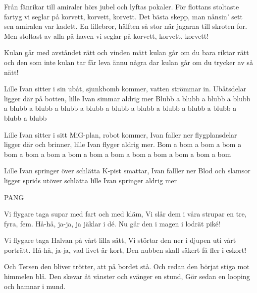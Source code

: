 \songtext{}Från fänrikar till amiraler
hörs jubel och lyftas pokaler.
För flottans stoltaste fartyg
vi seglar på korvett, korvett, korvett.
Det bästa skepp, man nånsin' sett
sen amiralen var kadett.
En lillebror, hälften så stor
när jagarna till skroten for.
Men stoltast av alla på haven
vi seglar på korvett, korvett, korvett!





\songtext{}Kulan går
med avståndet rätt och vinden mätt
kulan går
om du bara riktar rätt
och den som inte kulan tar
får leva ännu några dar
kulan går
om du trycker av så nätt!





\songtext{}Lille Ivan sitter i sin ubåt,
sjunkbomb kommer, vatten strömmar in.
Ubåtsdelar ligger där på botten,
lille Ivan simmar aldrig mer
Blubb a blubb a blubb a blubb a blubb a blubb a 
blubb a blubb a blubb a blubb a blubb a blubb a
blubb a blubb a blubb

Lille Ivan sitter i sitt MiG-plan,
robot kommer, Ivan faller ner
flygplansdelar ligger där och brinner,
lille Ivan flyger aldrig mer.
Bom a bom a bom a bom a bom a bom a bom a
bom a bom a bom a bom a bom a bom a bom a
bom

Lille Ivan springer över schlätta
K-pist smattar, Ivan falller ner
Blod och slamsor ligger sprids utöver schlätta
lille Ivan springer aldrig mer

PANG




\songtext{}Vi flygare taga supar med fart och med kläm,
Vi slår dem i våra strupar en tre, fyra, fem.
Hå-hå, ja-ja, ja jäklar i dé.
Nu går den i magen i lodrät piké!

Vi flygare taga Halvan på vårt lilla sätt,
Vi störtar den ner i djupen uti vårt porträtt.
Hå-hå, ja-ja, vad livet är kort,
Den nubben skall säkert få fler i eskort!

Och Tersen den bliver trötter, att på bordet stå.
Och redan den börjat stiga mot himmelen blå.
Den skevar åt vänster och svänger en stund,
Gör sedan en looping och hamnar i mund.


